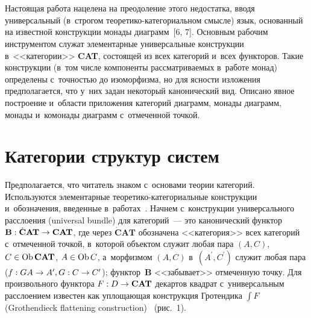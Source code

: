 \begin{multicols}{2}
\begin{figure*}[b]     %
\vspace*{-6pt}
\begin{minipage}[b]{80mm}
     \begin{center}
   \mbox{%
\epsfxsize=23.362mm 
}
\end{center}
\vspace*{-12pt}
\end{minipage}
\hfill
\begin{minipage}[b]{80mm}
 \begin{center}
   \mbox{%
\epsfxsize=25.998mm 
}

\end{center}
\vspace*{-12pt}
\end{minipage}
\end{figure*}
     
     Настоящая работа нацелена на преодоление этого недостатка, вводя 
универсальный (в~строгом тео\-ре\-ти\-ко-ка\-те\-го\-ри\-аль\-ном смысле) язык, 
основанный на известной конструкции монады диаграмм~[6, 7]. Основным 
рабочим инструментом служат элементарные универсальные конструкции 
в~<<категории>> \textbf{CAT}, состоящей из всех категорий и~всех функторов. 
Такие конструкции (в~том числе компоненты рассматриваемых в~работе 
монад) определены с~точ\-ностью до изоморфизма, но для ясности изложения 
предполагается, что у~них задан некоторый канонический вид. Описано явное 
построение и~об\-ласти приложения категорий диаграмм, монады диаграмм, 
монады и~комонады диаграмм с~отмеченной точкой.

\section{Категории структур систем}

     Предполагается, что читатель знаком с~основами теории категорий. 
Используются элементарные теоретико-категориальные конструкции 
и~обозначения, введенные в~работах~\cite{7-kov, 8-kov}. Начнем с~конструкции 
универсального расслоения (universal bundle) для категорий~--- это 
канонический функтор $\mathbf{B}: \dot{\mathbf{C}}\mathbf{AT} \hm\to 
\mathbf{CAT}$, где через $\dot{\mathbf{C}}\mathbf{AT}$ обозначена 
<<категория>> всех категорий с~отмеченной точкой, в~которой объектом 
служит любая пара $(A, C)$, $C \hm\in \mathrm{Ob}\,\mathbf{CAT}$, $A \hm\in 
\mathrm{Ob}\,C$, а~морфизмом $(A, C)$ в~$(A^\prime, C^\prime)$ служит любая 
пара ($f : GA \hm\to  A^\prime, G : C \hm\to C^\prime$); функтор~$\mathbf{B}$ 
<<забывает>> отмеченную точку. Для произвольного функтора 
$F : D \hm\to\mathbf{CAT}$ декартов квадрат с~универсальным расслоением 
из\-вес\-тен как уплощающая конструкция Гротендика $\int F$ (Grothendieck 
flattening construction)~\cite{9-kov} (рис.~1).






\end{multicols}
